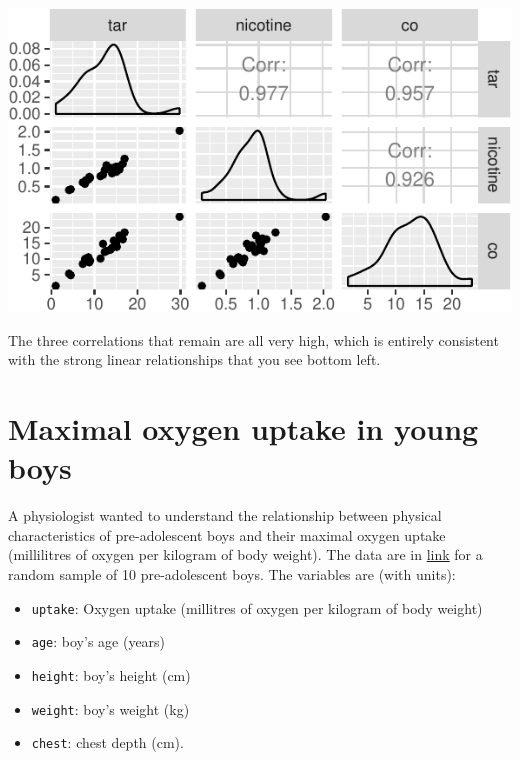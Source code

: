 \documentclass[]{tufte-book}
\newenvironment{Shaded}{}{}
\newcommand{\KeywordTok}[1]{\textcolor[rgb]{0.00,0.44,0.13}{\textbf{#1}}}
\newcommand{\NormalTok}[1]{#1}
\newcommand{\OperatorTok}[1]{\textcolor[rgb]{0.40,0.40,0.40}{#1}}
\newcommand{\StringTok}[1]{\textcolor[rgb]{0.25,0.44,0.63}{#1}}
\theoremstyle{definition}
\theoremstyle{definition}
\theoremstyle{definition}
\theoremstyle{remark}
\begin{document}
\begin{Shaded}
\end{Shaded}

\includegraphics{12-regression_files/figure-latex/unnamed-chunk-25-1}

The three correlations that remain are all very high, which is entirely
consistent with the strong linear relationships that you see bottom
left.

\hypertarget{maximal-oxygen-uptake-in-young-boys}{%
\section{Maximal oxygen uptake in young
boys}\label{maximal-oxygen-uptake-in-young-boys}}

A physiologist wanted to understand the relationship between physical
characteristics of pre-adolescent boys and their maximal oxygen uptake
(millilitres of oxygen per kilogram of body weight). The data are in
\href{http://www.utsc.utoronto.ca/~butler/c32/youngboys.txt}{link} for a
random sample of 10 pre-adolescent boys. The variables are (with units):

\begin{itemize}
\item
  \texttt{uptake}: Oxygen uptake (millitres of oxygen per kilogram of
  body weight)
\item
  \texttt{age}: boy's age (years)
\item
  \texttt{height}: boy's height (cm)
\item
  \texttt{weight}: boy's weight (kg)
\item
  \texttt{chest}: chest depth (cm).
\end{itemize}
\end{document}
